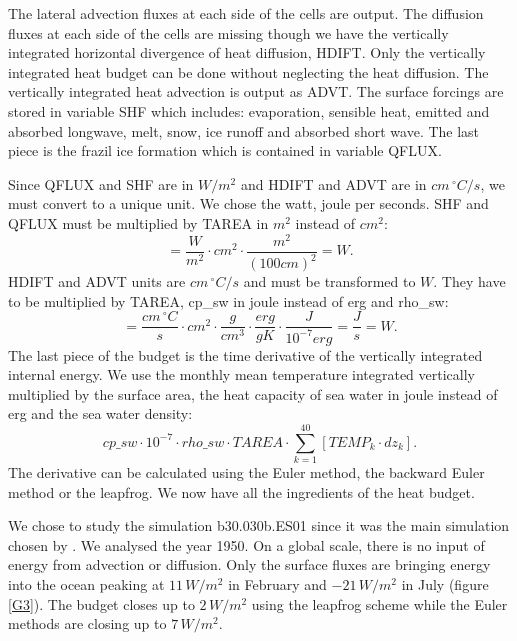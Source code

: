 The lateral advection fluxes at each side of the cells are output. The diffusion fluxes at each side of the cells are missing though we have the vertically integrated horizontal divergence of heat diffusion, HDIFT. Only the vertically integrated heat budget can be done without neglecting the heat diffusion. The vertically integrated heat advection is output as ADVT. The surface forcings are stored in variable SHF which includes: evaporation, sensible heat, emitted and absorbed longwave, melt, snow, ice runoff and absorbed short wave. The last piece is the frazil ice formation which is contained in variable QFLUX. 

Since QFLUX and SHF are in $W/m^2$ and HDIFT and ADVT are in $cm \, ^\circ C/s$, we must convert to a unique unit. We chose the watt, joule per seconds. SHF and QFLUX must be multiplied by TAREA in $m^2$ instead of $cm^2$:
\begin{equation}
[ SHF \cdot TAREA \cdot 10^{-4}] = \frac{W}{m^2} \cdot cm^2 \cdot \frac{m^2}{(100 cm)^2} = W.
\end{equation}
HDIFT and ADVT units are $cm \, ^\circ C/s$ and must be transformed to $W$. They have to be multiplied by TAREA, cp\_sw in joule instead of erg and rho\_sw:
\begin{equation}
[HDIFT \cdot TAREA \cdot rho\_sw \cdot cp\_sw \cdot 10^{-7}] = \frac{cm \, ^\circ C}{s} \cdot cm^2 \cdot \frac{g}{cm^3} \cdot \frac{erg}{g K} \cdot \frac{ J}{10^{-7} erg} = \frac{J}{s} = W.
\end{equation}
The last piece of the budget is the time derivative of the vertically integrated internal energy. We use the monthly mean temperature integrated vertically multiplied by the surface area, the heat capacity of sea water in joule instead of erg and the sea water density:
\begin{equation}
cp\_sw \cdot 10^{-7} \cdot rho\_sw \cdot TAREA\cdot \sum_{k=1}^{40} \left[TEMP_k \cdot dz_k\right].
\end{equation}
The derivative can be calculated using the Euler method, the backward Euler method or the leapfrog. We now have all the ingredients of the heat budget. 

We chose to study the simulation b30.030b.ES01 since it was the main simulation chosen by \cite{ISI:000242942100008}. We analysed the year 1950. On a global scale, there is no input of energy from advection or diffusion. Only the surface fluxes are bringing energy into the ocean peaking at $11 \, W/m^2$ in February and $-21 \, W/m^2$ in July (figure \ref{G3}). The budget closes up to $2 \, W/m^2$ using the leapfrog scheme while the Euler methods are closing up to $7 \, W/m^2$. 

